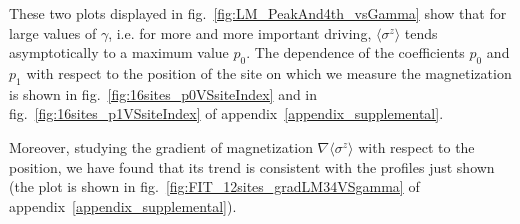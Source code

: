 These two plots displayed in fig.~\ref{fig:LM_PeakAnd4th_vsGamma} show that for large values of $\gamma$, i.e. for more and more important driving, $\langle\sigma^z\rangle$ tends asymptotically to a maximum value $p_0$. The dependence of the coefficients $p_0$ and $p_1$ with respect to the position of the site on which we measure the magnetization is shown in fig.~\ref{fig:16sites_p0VSsiteIndex} and in fig.~\ref{fig:16sites_p1VSsiteIndex} of appendix~\ref{appendix_supplemental}.

Moreover, studying the gradient of magnetization $\nabla \langle \sigma^z \rangle$ with respect to the position, we have found that its trend is consistent with the profiles just shown (the plot is shown in fig.~\ref{fig:FIT_12sites_gradLM34VSgamma} of appendix~\ref{appendix_supplemental}).






